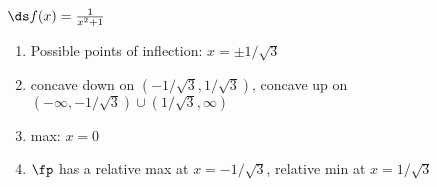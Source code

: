 {$\ds f(x) = \frac{1}{x^2+1}$
}
{\begin{enumerate}[label=(\alph*)]
\item Possible points of inflection: $x=\pm1/\sqrt{3}$
\item concave down on $(-1/\sqrt{3},1/\sqrt{3})$,
concave up on $(-\infty,-1/\sqrt{3}) \cup (1/\sqrt{3},\infty)$
\item max: $x=0$
\item $\fp$ has a relative max at $x = -1/\sqrt{3}$,
relative min at $x=1/\sqrt{3}$
\end{enumerate}}
